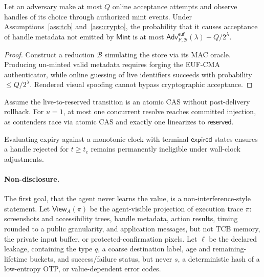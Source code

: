 \documentclass[sigconf,10pt]{acmart}
\newcommand{\Mint}{\ensuremath{\mathsf{Mint}}}
\newcommand{\Adv}{\ensuremath{\mathsf{Adv}}}
\newcommand{\View}{\ensuremath{\mathsf{View}}}
\theoremstyle{acmplain}%
\begin{document}
\begin{theorem}
\label{thm:unforgeability}
Let an adversary make at most $Q$ online acceptance attempts and observe handles of its choice through authorized mint events. Under Assumptions~\ref{ass:tcb} and~\ref{ass:crypto}, the probability that it causes acceptance of handle metadata not emitted by \Mint{} is at most $\Adv^{\mathsf{euf}}_{F,\mathcal{B}}(\lambda)+Q/2^\lambda$.
\end{theorem}
\begin{proof}
Construct a reduction $\mathcal{B}$ simulating the store via its MAC oracle. Producing un-minted valid metadata requires forging the EUF-CMA authenticator, while online guessing of live identifiers succeeds with probability $\le Q/2^\lambda$. Rendered visual spoofing cannot bypass cryptographic acceptance.
\end{proof}

\begin{proposition}
\label{prop:singleuse}
Assume the live-to-reserved transition is an atomic CAS without post-delivery rollback. For $u=1$, at most one concurrent resolve reaches committed injection, as contenders race via atomic CAS and exactly one linearizes to $\mathsf{reserved}$.
\end{proposition}

\begin{proposition}
\label{prop:expiry}
Evaluating expiry against a monotonic clock with terminal $\mathsf{expired}$ states ensures a handle rejected for $t\ge t_e$ remains permanently ineligible under wall-clock adjustments.
\end{proposition}

\paragraph{Non-disclosure.} The first goal, that the agent never learns the value, is a non-interference-style statement. Let $\View_A(\pi)$ be the agent-visible projection of execution trace $\pi$: screenshots and accessibility trees, handle metadata, action results, timing rounded to a public granularity, and application messages, but not TCB memory, the private input buffer, or protected-confirmation pixels. Let $\ell$ be the declared leakage, containing the type $q$, a coarse destination label, age and remaining-lifetime buckets, and success/failure status, but never $s$, a deterministic hash of a low-entropy OTP, or value-dependent error codes.
\end{document}
